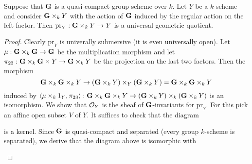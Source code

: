\begin{proposition}\label{proposition:trivial_bundle_is_universal_geometric_quotient}
Suppose that $\mathbf{G}$ is a quasi-compact group scheme over $k$. Let $Y$ be a $k$-scheme and consider $\mathbf{G}\times_kY$ with the action of $\mathbf{G}$ induced by the regular action on the left factor. Then $\mathrm{pr}_Y:\mathbf{G}\times_kY\rightarrow Y$ is a universal geometric quotient. 
\end{proposition}
\begin{proof}
Clearly $\mathrm{pr}_Y$ is univerally submersive (it is even universally open). Let $\mu:\mathbf{G}\times_k\mathbf{G}\rightarrow \mathbf{G}$ be the multiplication morphism and let $\pi_{23}:\mathbf{G}\times_k\mathbf{G}\times Y\rightarrow \mathbf{G}\times_kY$ be the projection on the last two factors. Then the morphism 
$$\mathbf{G}\times_k\mathbf{G}\times_kY\rightarrow \left(\mathbf{G}\times_kY\right)\times_Y\left(\mathbf{G}\times_kY\right) = \mathbf{G}\times_k\mathbf{G}\times_kY$$
induced by $\langle \mu\times_k1_Y, \pi_{23}\rangle:\mathbf{G}\times_k\mathbf{G}\times_kY\rightarrow \left(\mathbf{G}\times_kY\right)\times_k\left(\mathbf{G}\times_kY\right)$ is an isomorphism. We show that ${\mathcal O}_Y$ is the sheaf of $\mathbf{G}$-invariants for $\mathrm{pr}_Y$. For this pick an affine open subset $V$ of $Y$. It suffices to check that the diagram
\begin{center}
\end{center}
is a kernel. Since $\mathbf{G}$ is quasi-compact and separated (every group $k$-scheme is separated), we derive that the diagram above is isomorphic with
\begin{center}
\end{center}
\end{proof}
